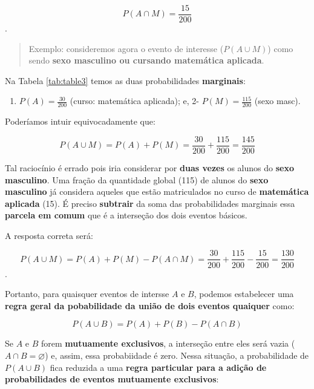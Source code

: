 \documentclass[
]{book}
\providecommand{\tightlist}{%
  \setlength{\itemsep}{0pt}\setlength{\parskip}{0pt}}
\begin{document}
\hfill\break

\[
P(A \cap M) = \frac{15}{200}
\].

\hfill\break

\begin{quote}
Exemplo: consideremos agora o evento de interesse (\(P(A \cup M)\)) como sendo \textbf{sexo masculino ou cursando matemática aplicada}.
\end{quote}

\hfill\break

Na Tabela \ref{tab:table3} temos as duas probabilidades \textbf{marginais}:

\hfill\break

\begin{enumerate}
\def\labelenumi{\arabic{enumi}.}
\tightlist
\item
  \(P(A)=\frac{30}{200}\) (curso: matemática aplicada); e,
  2- \(P(M)=\frac{115}{200}\) (sexo masc).
\end{enumerate}

\hfill\break

Poderíamos intuir equivocadamente que:

\hfill\break

\[
P(A \cup M) = P(A) + P(M) = \frac{30}{200} + \frac{115}{200} = \frac{145}{200}
\]

\hfill\break

Tal raciocínio é errado pois iria considerar por \textbf{duas vezes} os alunos do \textbf{sexo masculino}. Uma fração da quantidade global (115) de alunos do \textbf{sexo masculino} já considera aqueles que estão matriculados no curso de \textbf{matemática aplicada} (15). É preciso \textbf{subtrair} da soma das probabilidades marginais essa \textbf{parcela em comum} que é a interseção dos dois eventos básicos.

A resposta correta será:

\[
P(A \cup M) = P(A) + P(M) - P(A \cap M) = \frac{30}{200} + \frac{115}{200} -\frac{15}{200} = \frac{130}{200}
\].

\hfill\break

Portanto, para quaisquer eventos de intersse \(A\) e \(B\), podemos estabelecer uma \textbf{regra geral da pobabilidade da união de dois eventos quaiquer} como:

\hfill\break

\[
P(A \cup B) = P(A) + P(B) - P(A \cap B)
\]

\hfill\break

Se \(A\) e \(B\) forem \textbf{mutuamente exclusivos}, a interseção entre eles será vazia (\(A \cap B =\varnothing\)) e, assim, essa probabiidade é zero. Nessa situação, a probabilidade de \(P(A \cup B)\) fica reduzida a uma \textbf{regra particular para a adição de probabilidades de eventos mutuamente exclusivos}:
\end{document}
